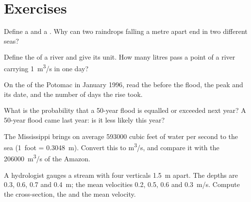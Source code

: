 \section{Exercises}

\begin{exercise}[$\star$]\label{exo:g10:drainage-basins:1}
Define a  and a . Why can two raindrops falling
a metre apart end in two different seas?
\end{exercise}

\begin{exercise}[$\star$]\label{exo:g10:drainage-basins:2}
Define the  of a river and give its unit. How many litres pass a
point of a river carrying \qty{1}{m^3/s} in one day?
\end{exercise}

\begin{exercise}[$\star$]\label{exo:g10:drainage-basins:3}
On the  of the Potomac in January 1996, read the  before
the flood, the peak  and its date, and the number of days the rise
took.
\end{exercise}

\begin{exercise}[$\star$]\label{exo:g10:drainage-basins:4}
What is the probability that a \num{50}-year flood is equalled or exceeded
next year? A \num{50}-year flood came last year: is it less likely this
year?
\end{exercise}

\begin{exercise}[$\star$]\label{exo:g10:drainage-basins:5}
The Mississippi brings on average \num{593000} cubic feet of water per
second to the sea (\num{1}~foot = \qty{0.3048}{m}). Convert this 
to \unit{m^3/s}, and compare it with the \qty{206000}{m^3/s} of the
Amazon.
\end{exercise}

\begin{exercise}[$\star\star$]\label{exo:g10:drainage-basins:6}
A hydrologist gauges a stream with four verticals \qty{1.5}{m} apart. The
depths are \num{0.3}, \num{0.6}, \num{0.7} and \qty{0.4}{m}; the mean
velocities \num{0.2}, \num{0.5}, \num{0.6} and \qty{0.3}{m/s}. Compute the
cross-section, the  and the mean velocity.
\end{exercise}

